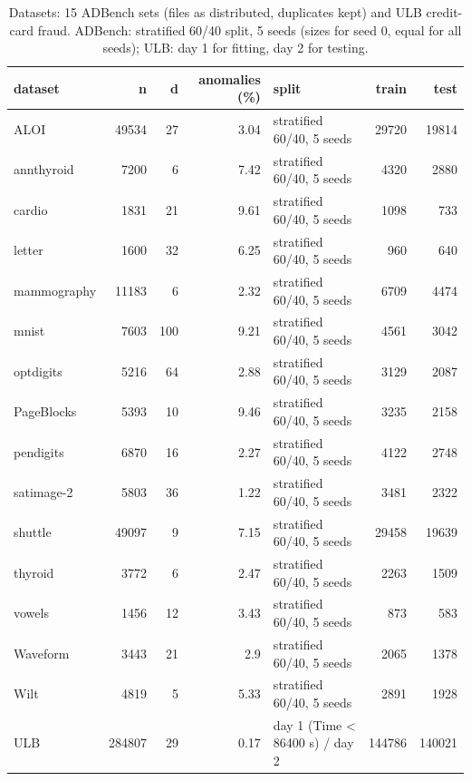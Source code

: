 \begin{table}[t]
\centering
\small
\setlength{\tabcolsep}{5pt}
\caption{Datasets: 15 ADBench sets (files as distributed, duplicates kept) and ULB credit-card fraud. ADBench: stratified 60/40 split, 5 seeds (sizes for seed 0, equal for all seeds); ULB: day 1 for fitting, day 2 for testing.}
\label{tab:setup-datasets}
\begin{tabular}{lrrrlrr}
\toprule
dataset & n & d & anomalies (\%) & split & train & test \\
\midrule
ALOI & 49534 & 27 & 3.04 & stratified 60/40, 5 seeds & 29720 & 19814 \\
annthyroid & 7200 & 6 & 7.42 & stratified 60/40, 5 seeds & 4320 & 2880 \\
cardio & 1831 & 21 & 9.61 & stratified 60/40, 5 seeds & 1098 & 733 \\
letter & 1600 & 32 & 6.25 & stratified 60/40, 5 seeds & 960 & 640 \\
mammography & 11183 & 6 & 2.32 & stratified 60/40, 5 seeds & 6709 & 4474 \\
mnist & 7603 & 100 & 9.21 & stratified 60/40, 5 seeds & 4561 & 3042 \\
optdigits & 5216 & 64 & 2.88 & stratified 60/40, 5 seeds & 3129 & 2087 \\
PageBlocks & 5393 & 10 & 9.46 & stratified 60/40, 5 seeds & 3235 & 2158 \\
pendigits & 6870 & 16 & 2.27 & stratified 60/40, 5 seeds & 4122 & 2748 \\
satimage-2 & 5803 & 36 & 1.22 & stratified 60/40, 5 seeds & 3481 & 2322 \\
shuttle & 49097 & 9 & 7.15 & stratified 60/40, 5 seeds & 29458 & 19639 \\
thyroid & 3772 & 6 & 2.47 & stratified 60/40, 5 seeds & 2263 & 1509 \\
vowels & 1456 & 12 & 3.43 & stratified 60/40, 5 seeds & 873 & 583 \\
Waveform & 3443 & 21 & 2.9 & stratified 60/40, 5 seeds & 2065 & 1378 \\
Wilt & 4819 & 5 & 5.33 & stratified 60/40, 5 seeds & 2891 & 1928 \\
ULB & 284807 & 29 & 0.17 & day 1 (Time < 86400 s) / day 2 & 144786 & 140021 \\
\bottomrule
\end{tabular}
\end{table}
